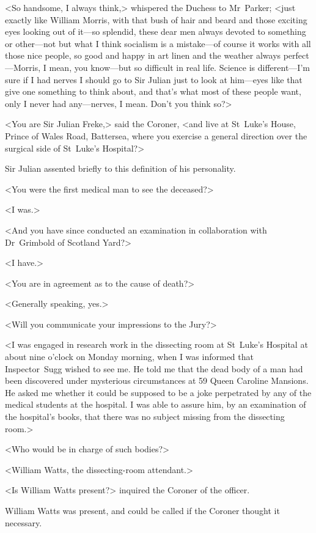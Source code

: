 <So handsome, I always think,> whispered the Duchess to Mr~Parker; <just exactly like William Morris, with that bush of hair and beard and those exciting eyes looking out of it—so splendid, these dear men always devoted to something or other—not but what I think socialism is a mistake—of course it works with all those nice people, so good and happy in art linen and the weather always perfect—Morris, I mean, you know—but so difficult in real life. Science is different—I'm sure if I had nerves I should go to Sir Julian just to look at him—eyes like that give one something to think about, and that's what most of these people want, only I never had any—nerves, I mean. Don't you think so?>

<You are Sir Julian Freke,> said the Coroner, <and live at St~Luke's House, Prince of Wales Road, Battersea, where you exercise a general direction over the surgical side of St~Luke's Hospital?>

Sir Julian assented briefly to this definition of his personality.

<You were the first medical man to see the deceased?>

<I was.>

<And you have since conducted an examination in collaboration with Dr~Grimbold of Scotland Yard?>

<I have.>

<You are in agreement as to the cause of death?>

<Generally speaking, yes.>

<Will you communicate your impressions to the Jury?>

<I was engaged in research work in the dissecting room at St~Luke's Hospital at about nine o'clock on Monday morning, when I was informed that Inspector~Sugg wished to see me. He told me that the dead body of a man had been discovered under mysterious circumstances at 59 Queen Caroline Mansions. He asked me whether it could be supposed to be a joke perpetrated by any of the medical students at the hospital. I was able to assure him, by an examination of the hospital's books, that there was no subject missing from the dissecting room.>

<Who would be in charge of such bodies?>

<William Watts, the dissecting-room attendant.>

<Is William Watts present?> inquired the Coroner of the officer.

William Watts was present, and could be called if the Coroner thought it necessary.

